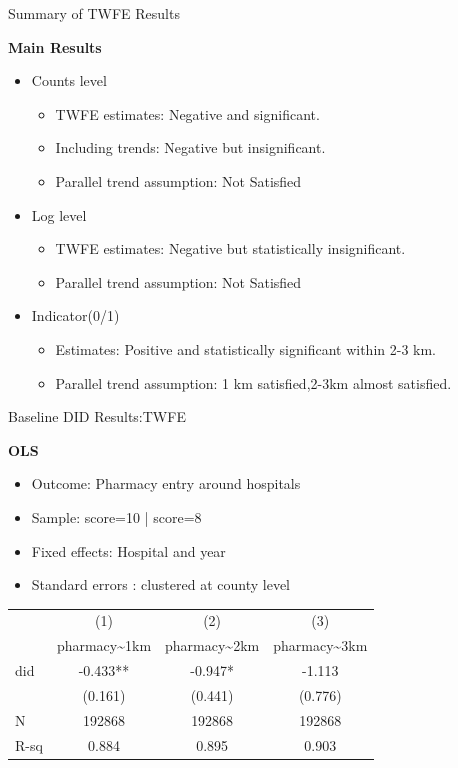 \documentclass{beamer}
\begin{document}
\begin{frame}{Summary of TWFE Results}

\textbf{Main Results}

\begin{itemize}
    \item Counts level
    \begin{itemize}
        \item TWFE  estimates: Negative and significant.
        \item Including  trends: Negative but insignificant.
        \item Parallel trend assumption: Not Satisfied
    \end{itemize}

    \item Log level
    \begin{itemize}
    \item TWFE  estimates: Negative but statistically insignificant.
    \item Parallel trend assumption: Not Satisfied 
    \end{itemize}

    \item Indicator(0/1)
    \begin{itemize}
    \item Estimates: Positive and statistically significant within 2-3 km.
    \item Parallel trend assumption: 1 km satisfied,2-3km almost satisfied.
    \end{itemize}

\end{itemize}


\end{frame}



\begin{frame}{Baseline DID Results:TWFE}

\textbf{OLS}

\begin{itemize}
    \item Outcome: Pharmacy entry around hospitals 
    \item Sample: score=10 | score=8
    \item Fixed effects: Hospital and year
    \item Standard errors : clustered at  county level  
\end{itemize}

\vspace{0.5em}
\centering
\footnotesize
\begin{tabular}{lccc}
\hline
\hline
 & (1) & (2) & (3) \\
 & pharmacy\textasciitilde 1km & pharmacy\textasciitilde 2km & pharmacy\textasciitilde 3km \\
\hline
did & -0.433** & -0.947* & -1.113 \\
 & (0.161) & (0.441) & (0.776) \\
\hline
N & 192868 & 192868 & 192868 \\
R-sq & 0.884 & 0.895 & 0.903 \\
\hline
\hline
\end{tabular}

\end{frame}
\end{document}
